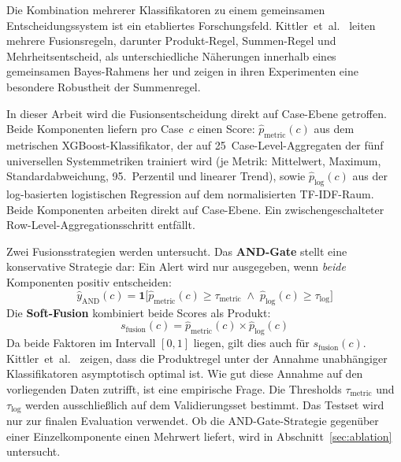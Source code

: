 Die Kombination mehrerer Klassifikatoren zu einem gemeinsamen Entscheidungssystem
ist ein etabliertes Forschungsfeld. Kittler~et~al.~\cite{kittler1998combining} leiten mehrere Fusionsregeln,
darunter Produkt-Regel, Summen-Regel und Mehrheitsentscheid, als unterschiedliche
Näherungen innerhalb eines gemeinsamen Bayes-Rahmens her und zeigen in ihren
Experimenten eine besondere Robustheit der Summenregel.

In dieser Arbeit wird die Fusionsentscheidung direkt auf Case-Ebene getroffen.
Beide Komponenten liefern pro Case~$c$ einen Score:
$\hat{p}_{\text{metric}}(c)$ aus dem metrischen XGBoost-Klassifikator, der auf
25~Case-Level-Aggregaten der fünf universellen Systemmetriken trainiert wird
(je Metrik: Mittelwert, Maximum, Standardabweichung, 95.~Perzentil und linearer
Trend), sowie $\hat{p}_{\text{log}}(c)$ aus der log-basierten logistischen
Regression auf dem normalisierten TF-IDF-Raum. Beide Komponenten arbeiten direkt
auf Case-Ebene. Ein zwischengeschalteter Row-Level-Aggregationsschritt entfällt.

Zwei Fusionsstrategien werden untersucht. Das \textbf{AND-Gate} stellt eine
konservative Strategie dar: Ein Alert wird nur ausgegeben, wenn \emph{beide}
Komponenten positiv entscheiden:
\[
  \hat{y}_{\text{AND}}(c) = \mathbf{1}\!\bigl[
    \hat{p}_{\text{metric}}(c) \geq \tau_{\text{metric}}
    \;\wedge\;
    \hat{p}_{\text{log}}(c) \geq \tau_{\text{log}}
  \bigr]
\]
Die \textbf{Soft-Fusion} kombiniert beide Scores als Produkt:
\[
  s_{\text{fusion}}(c) = \hat{p}_{\text{metric}}(c) \times \hat{p}_{\text{log}}(c)
\]
Da beide Faktoren im Intervall $[0,1]$ liegen, gilt dies auch für
$s_{\text{fusion}}(c)$. Kittler~et~al.~\cite{kittler1998combining} zeigen, dass
die Produktregel unter der Annahme unabhängiger Klassifikatoren asym\-pto\-tisch
optimal ist. Wie gut diese Annahme auf den vorliegenden Daten zutrifft, ist eine
empirische Frage. Die Thresholds $\tau_{\text{metric}}$ und $\tau_{\text{log}}$
werden ausschließlich auf dem Validierungsset bestimmt. Das Testset wird nur zur
finalen Evaluation verwendet. Ob die AND-Gate-Strategie gegenüber einer
Einzelkomponente einen Mehrwert liefert, wird in Abschnitt~\ref{sec:ablation}
untersucht.
